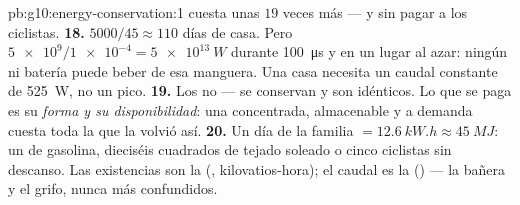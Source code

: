 \begin{solution}{pb:g10:energy-conservation:1}
cuesta unas $19$ veces más --- y sin pagar a los ciclistas.
\textbf{18.} $5000/45 \approx 110$ días de casa. Pero
$\num{5e9}/\num{1e-4} = \qty{5e13}{W}$ durante \qty{100}{\micro s} y en
un lugar al azar: ningún  ni batería puede beber de esa
manguera. Una casa necesita un caudal constante de \qty{525}{W}, no un
pico.
\textbf{19.} Los  no --- se conservan y son idénticos. Lo que se
paga es su \emph{forma y su disponibilidad}: una  concentrada,
almacenable y a demanda cuesta toda la  que la
volvió así.
\textbf{20.} Un día de la familia $= \qty{12.6}{kW.h} \approx
\qty{45}{MJ}$: un  de gasolina, dieciséis  cuadrados de
tejado soleado o cinco ciclistas sin descanso. Las existencias son la
 (, kilovatios-hora); el caudal es la  () ---
la bañera y el grifo, nunca más confundidos.
\end{solution}
